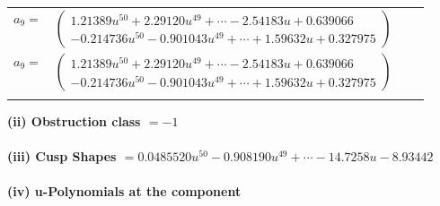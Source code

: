 \documentclass[1p]{elsarticle_modified}
\theoremstyle{definition}
\begin{document}
\begin{tabular}{m{7pt} m{180pt} m{7pt} m{180pt} }
\flushright $a_{9}=$&$\begin{pmatrix}1.21389 u^{50}+2.29120 u^{49}+\cdots-2.54183 u+0.639066\\-0.214736 u^{50}-0.901043 u^{49}+\cdots+1.59632 u+0.327975\end{pmatrix}$\\ \flushright $a_{9}=$&$\begin{pmatrix}1.21389 u^{50}+2.29120 u^{49}+\cdots-2.54183 u+0.639066\\-0.214736 u^{50}-0.901043 u^{49}+\cdots+1.59632 u+0.327975\end{pmatrix}$\\&\end{tabular}
\flushleft \textbf{(ii) Obstruction class $= -1$}\\~\\
\flushleft \textbf{(iii) Cusp Shapes $= 0.0485520 u^{50}-0.908190 u^{49}+\cdots-14.7258 u-8.93442$}\\~\\
\newpage\renewcommand{\arraystretch}{1}
\flushleft \textbf{(iv) u-Polynomials at the component}\newline \\
\end{document}
